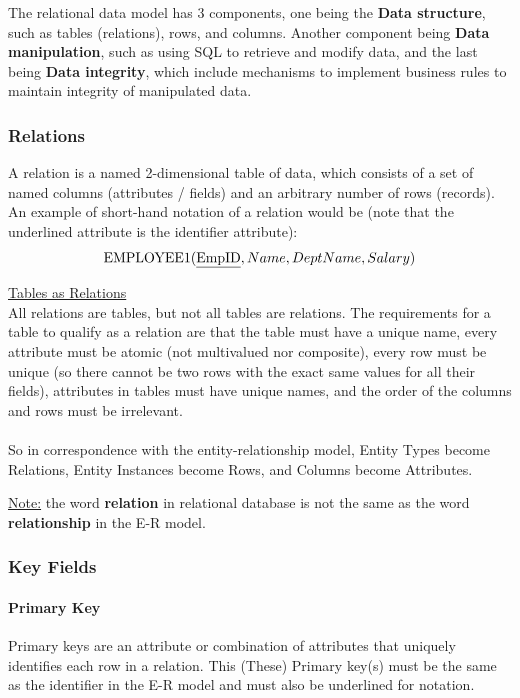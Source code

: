 \documentclass[12pt]{article}
\begin{document}
The relational data model has 3 components, one being the \textbf{Data structure}, such as tables (relations), rows, and columns. Another component being \textbf{Data manipulation}, such as using SQL to retrieve and modify data, and the last being \textbf{Data integrity}, which include mechanisms to implement business rules to maintain integrity of manipulated data.

\subsubsection{Relations}

A relation is a named 2-dimensional table of data, which consists of a set of named columns (attributes / fields) and an arbitrary number of rows (records). An example of short-hand notation of a relation would be (note that the underlined attribute is the identifier attribute): 
$$\text{EMPLOYEE1(\underline{EmpID}}, Name, DeptName, Salary)$$

\underline{Tables as Relations}\\
All relations are tables, but not all tables are relations. The requirements for a table to qualify as a relation are that the table must have a unique name, every attribute must be atomic (not multivalued nor composite), every row must be unique (so there cannot be two rows with the exact same values for all their fields), attributes in tables must have unique names, and the order of the columns and rows must be irrelevant.\\
\\
So in correspondence with the entity-relationship model, Entity Types become Relations, Entity Instances become Rows, and Columns become Attributes.

\begin{tcolorbox}
	\underline{Note:} the word \textbf{relation} in relational database is not the same as the word \textbf{relationship} in the E-R model.
\end{tcolorbox}

\subsubsection{Key Fields}

\paragraph{Primary Key} Primary keys are an attribute or combination of attributes that uniquely identifies each row in a relation. This (These) Primary key(s) must be the same as the identifier in the E-R model and must also be underlined for notation.
\end{document}
